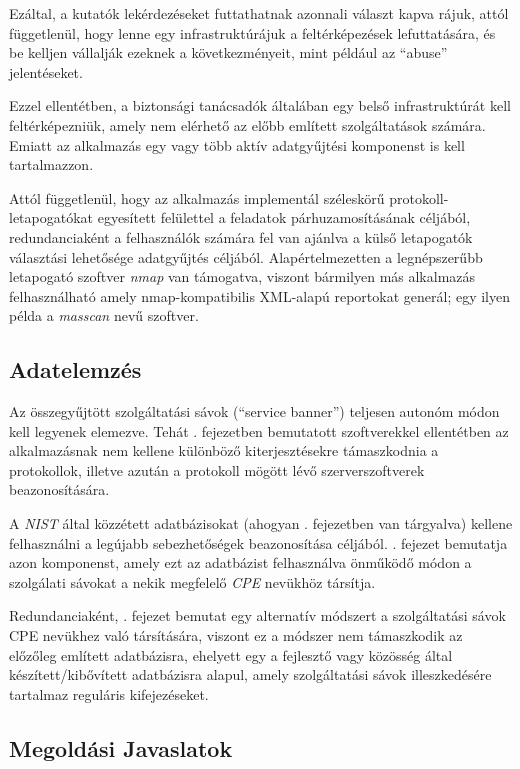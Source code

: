 \documentclass[a4paper,12pt]{article}
\begin{document}
	Ezáltal, a kutatók lekérdezéseket futtathatnak azonnali választ kapva rájuk, attól függetlenül, hogy lenne egy infrastruktúrájuk a feltérképezések lefuttatására, és be kelljen vállalják ezeknek a következményeit, mint például az ``abuse'' jelentéseket.
	
	Ezzel ellentétben, a biztonsági tanácsadók általában egy belső infrastruktúrát kell feltérképezniük, amely nem elérhető az előbb említett szolgáltatások számára. Emiatt az alkalmazás egy vagy több aktív adatgyűjtési komponenst is kell tartalmazzon.
	
	Attól függetlenül, hogy az alkalmazás implementál széleskörű protokoll-letapogatókat egyesített felülettel a feladatok párhuzamosításának céljából, redundanciaként a felhasználók számára fel van ajánlva a külső letapogatók választási lehetősége adatgyűjtés céljából. Alapértelmezetten a legnépszerűbb letapogató szoftver \textit{nmap} van támogatva, viszont bármilyen más alkalmazás felhasználható amely nmap-kompatibilis XML-alapú reportokat generál; egy ilyen példa a \textit{masscan} nevű szoftver.

\subsection{Adatelemzés}

	Az összegyűjtött szolgáltatási sávok (``service banner'') teljesen autonóm módon kell legyenek elemezve. Tehát \az{\ref{relwork}}. fejezetben bemutatott szoftverekkel ellentétben az alkalmazásnak nem kellene különböző kiterjesztésekre támaszkodnia a protokollok, illetve azután a protokoll mögött lévő szerverszoftverek beazonosítására.

	A \textit{NIST} által közzétett adatbázisokat (ahogyan \az{\ref{ssec:vulndbs}}. fejezetben van tárgyalva) kellene felhasználni a legújabb sebezhetőségek beazonosítása céljából. \Az{\ref{ssec:matchcpe}}. fejezet bemutatja azon komponenst, amely ezt az adatbázist felhasználva önműködő módon a szolgálati sávokat a nekik megfelelő \textit{CPE} nevükhöz társítja.

	Redundanciaként, \az{\ref{ssec:patternmatch}}. fejezet bemutat egy alternatív módszert a szolgáltatási sávok CPE nevükhez való társítására, viszont ez a módszer nem támaszkodik az előzőleg említett adatbázisra, ehelyett egy a fejlesztő vagy közösség által készített/kibővített adatbázisra alapul, amely szolgáltatási sávok illeszkedésére tartalmaz reguláris kifejezéseket.

\subsection{Megoldási Javaslatok}
\end{document}
